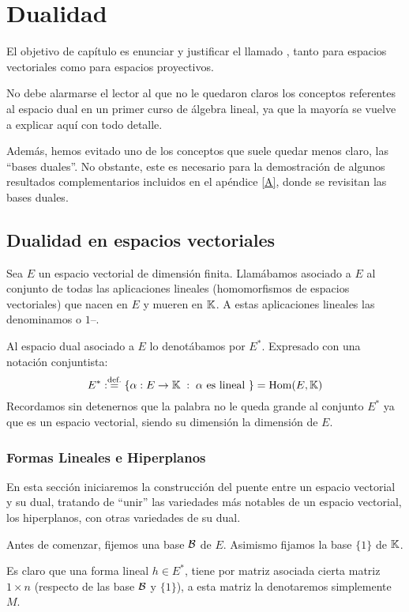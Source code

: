 \chapter{Dualidad}
\label{C2}
El objetivo de capítulo es enunciar y justificar el llamado , tanto para espacios vectoriales como para espacios proyectivos.

No debe alarmarse el lector al que no le quedaron claros los conceptos referentes al espacio dual en un primer curso de álgebra lineal, ya que la mayoría se vuelve a explicar aquí con todo detalle.

Además, hemos evitado uno de los conceptos que suele quedar menos claro, las ``bases duales''. No obstante, este es necesario para la demostración de algunos resultados complementarios incluidos en el apéndice \ref{A}, donde se revisitan las bases duales.
\section{Dualidad en espacios vectoriales}
\label{C2_dualidadVectoriales}
Sea $E$ un espacio vectorial de dimensión finita. Llamábamos  asociado a $E$ al conjunto de todas las aplicaciones lineales (homomorfismos de espacios vectoriales) que nacen en $E$ y mueren en $\mathbb{K}$. A estas aplicaciones lineales las denominamos  o $1$--.

Al espacio dual asociado a $E$ lo denotábamos por $E^*$. Expresado con una notación conjuntista:
\begin{equation}
	\label{C2_eq_defDual}
	E^*:\stackrel{\textrm{def.}}{=}\{\alpha:E\rightarrow \mathbb{K}\;:\; \alpha \text{ es lineal }\}=\mathrm{Hom}(E,\mathbb{K})
\end{equation}
Recordamos sin detenernos que la palabra  no le queda grande al conjunto $E^*$ ya que es un espacio vectorial, siendo su dimensión la dimensión de $E$.
\subsection{Formas Lineales e Hiperplanos}
En esta sección iniciaremos la construcción del puente entre un espacio vectorial y su dual, tratando de ``unir'' las variedades más notables de un espacio vectorial, los hiperplanos, con otras variedades de su dual.
 
Antes de comenzar, fijemos una base $\mathcal{B}$ de $E$. Asimismo fijamos la base $\{1\}$ de $\mathbb{K}$.

Es claro que una forma lineal $h\in E^*$, tiene por matriz asociada cierta matriz $1\times n$ (respecto de las base $\mathcal{B}$ y $\{1\}$), a esta matriz la  denotaremos simplemente $M$.

